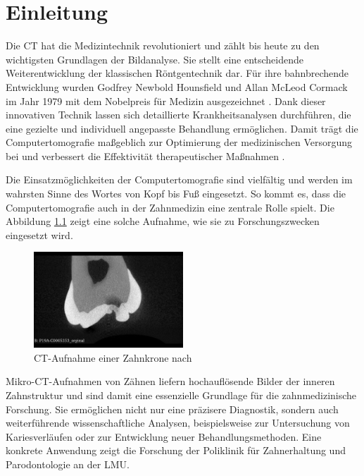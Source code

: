 \chapter{Einleitung}
\label{chap:einleitung} Die \ac{CT} hat die Medizintechnik revolutioniert und
zählt bis heute zu den wichtigsten Grundlagen der Bildanalyse. Sie stellt eine entscheidende
Weiterentwicklung der klassischen Röntgentechnik dar. Für ihre bahnbrechende
Entwicklung wurden Godfrey Newbold Hounsfield und Allan McLeod Cormack im Jahr
1979 mit dem Nobelpreis für Medizin ausgezeichnet \citep[vgl.][S.~12]{handels2000}.
Dank dieser innovativen Technik lassen sich detaillierte Krankheitsanalysen
durchführen, die eine gezielte und individuell angepasste Behandlung ermöglichen.
Damit trägt die Computertomografie maßgeblich zur Optimierung der medizinischen
Versorgung bei und verbessert die Effektivität therapeutischer Maßnahmen \citep[vgl.][S.~207]{de20083d}.

Die Einsatzmöglichkeiten der Computertomografie sind vielfältig und werden im wahrsten
Sinne des Wortes von Kopf bis Fuß eingesetzt. So kommt es, dass die Computertomografie
auch in der Zahnmedizin eine zentrale Rolle spielt. Die Abbildung
\ref{fig:ct_aufnahme_eines_zahns} zeigt eine solche Aufnahme, wie sie zu Forschungszwecken
eingesetzt wird.

\begin{figure}[h]
	\centering
	\includegraphics[width=0.5\textwidth]{img/micro_ct_orginal.jpg}
	\caption{CT-Aufnahme einer Zahnkrone nach \citet{heck2024}}
	\label{fig:ct_aufnahme_eines_zahns}
\end{figure}

Mikro-\ac{CT}-Aufnahmen von Zähnen liefern hochauflösende Bilder der inneren Zahnstruktur
und sind damit eine essenzielle Grundlage für die zahnmedizinische Forschung.
Sie ermöglichen nicht nur eine präzisere Diagnostik, sondern auch weiterführende
wissenschaftliche Analysen, beispielsweise zur Untersuchung von Kariesverläufen
oder zur Entwicklung neuer Behandlungsmethoden. Eine konkrete Anwendung zeigt die
Forschung der Poliklinik für Zahnerhaltung und Parodontologie an der \ac{LMU}.


